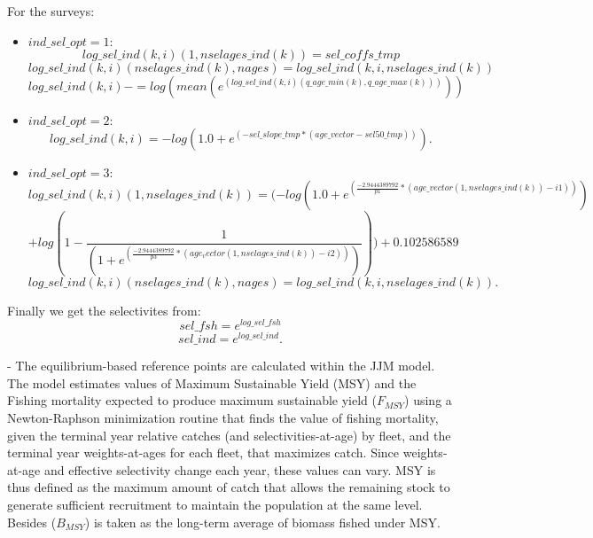 \documentclass{article}
\begin{document}
For the surveys:\\
\begin{itemize}
    \item $ind\_sel\_opt=1:$
      \begin{equation}
        log\_sel\_ind(k,i)(1,nselages\_ind(k))=sel\_coffs\_tmp
    \end{equation}
    \begin{equation}
        log\_sel\_ind(k,i)(nselages\_ind(k),nages)=log\_sel\_ind(k,i,nselages\_ind(k))
    \end{equation}
    \begin{equation}
        log\_sel\_ind(k,i)-=log(mean(e^{(log\_sel\_ind(k,i)(q\_age\_min(k),q\_age\_max(k)))}))
    \end{equation}
    \item $ind\_sel\_opt=2:$
        \begin{equation}
        log\_sel\_ind(k,i) = - log( 1.0 + e^{(-sel\_slope\_tmp * ( age\_vector - sel50\_tmp) )}).
    \end{equation}
    \item $ind\_sel\_opt=3:$
     \begin{equation}
        log\_sel\_ind(k,i)(1,nselages\_ind(k))     = ( -log(1.0 + e^{(\frac{-2.9444389792}{p1} * ( age\_vector(1,nselages\_ind(k)) - i1) )}) 
\end{equation}
    \begin{equation}
          +log(1 - \frac{1}{(1 + e^{(\frac{-2.9444389792}{p3} * ( age_vector(1,nselages\_ind(k)) - i2))})} ) )+0.102586589 
    \end{equation}
    \begin{equation}
         log\_sel\_ind(k,i)(nselages\_ind(k),nages) = log\_sel\_ind(k,i,nselages\_ind(k)).
    \end{equation}
\end{itemize}
Finally we get the selectivites from:
\begin{equation}
    sel\_fsh=e^{log\_sel\_fsh}
\end{equation}
\begin{equation}
    sel\_ind=e^{log\_sel\_ind}.
\end{equation}

- The equilibrium-based reference points are calculated within the JJM model. The model estimates values of Maximum Sustainable Yield (MSY) and the Fishing mortality expected to produce maximum sustainable yield (\(F_{MSY}\)) using a Newton-Raphson minimization routine that finds the value of fishing mortality, given the terminal year relative catches (and selectivities-at-age) by fleet,  and the terminal year weights-at-ages for each fleet, that maximizes catch. Since weights-at-age and effective selectivity change each year, these values can vary. MSY is thus defined as the maximum amount of catch that allows the remaining stock to generate sufficient recruitment to maintain the population at the same level. Besides (\(B_{MSY}\)) is taken as the long-term average of biomass fished under MSY.
\end{document}
